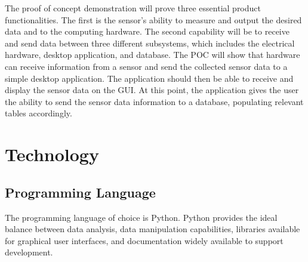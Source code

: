 \documentclass[12pt]{article}
\begin{document}
The proof of concept demonstration will prove three essential product
functionalities. The first is the sensor's ability to measure and output the  
desired data and to the computing hardware. The second capability will be to receive and send 
data between three different subsystems, which includes the electrical hardware, desktop application, and database. 
The POC will show that hardware can receive information from a sensor and send the collected sensor data 
to a simple desktop application. The application should then be able to receive and display the sensor 
data on the GUI. At this point, the application gives the user the ability to send the sensor data
information to a database, populating relevant tables accordingly. 

\section{Technology}

\subsection{Programming Language}

The programming language of choice is Python. Python provides the ideal balance between data analysis, data manipulation capabilities, libraries available for graphical user interfaces, and documentation widely available to support development.  
\end{document}

